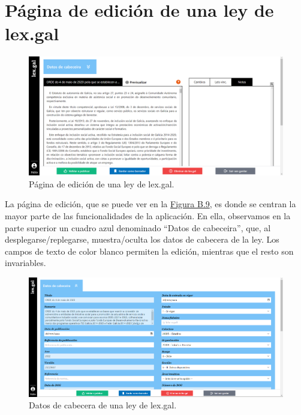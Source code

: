 \section{Página de edición de una ley de lex.gal}
\label{PEdicionLexGal}

\begin{figure}[H]
\centerline{\includegraphics[width=15cm]{figuras/manualUsuario/EditarPrincipal.PNG}}
\caption{Página de edición de una ley de lex.gal.}
\label{enlaceEdicionLexGal}
\end{figure}

La página de edición, que se puede ver en la \hyperref[enlaceEdicionLexGal]{Figura B.9}, es donde se centran la mayor parte de las funcionalidades de la aplicación. En ella, observamos en la parte superior un cuadro azul denominado ``Datos de cabeceira'', que, al desplegarse/replegarse, muestra/oculta los datos de cabecera de la ley. Los campos de texto de color blanco permiten la edición, mientras que el resto son invariables.

\begin{figure}[H]
\centerline{\includegraphics[width=15cm]{figuras/manualUsuario/EditarCabecera.PNG}}
\caption{Datos de cabecera de una ley de lex.gal.}
\label{enlaceCabeceraLexGal}
\end{figure}

